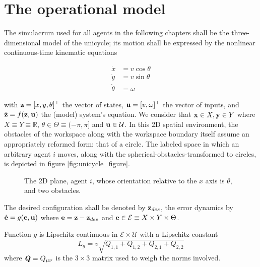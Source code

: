 \section{The operational model}

The simulacrum used for all agents in the following chapters shall be the
three-dimensional model of the unicycle; its motion shall be expressed by the
nonlinear continuous-time kinematic equations

\begin{align}
\label{eq:unicycle_kinematic}
  \dot{x}       &= v \cos\theta \\
  \dot{y}       &= v \sin\theta \\
  \dot{\theta}  &= \omega
\end{align}

with $\bm{\mathbf{z}} = [x,y,\theta]^{\top}$ the vector of states,
$\bm{\mathbf{u}} = [v, \omega]^{\top}$ the vector of inputs, and $\dot{\bm{\mathbf{z}}} =
f(\bm{\mathbf{z}}, \bm{\mathbf{u}})$ the (model) system's equation. We consider that
$\bm{\mathbf{x}} \in X, \bm{\mathbf{y}} \in Y$ where $X \equiv Y \equiv \mathbb{R}$,
$\theta \in \Theta \equiv (-\pi, \pi]$ and $\bm{\mathbf{u}} \in \mathcal{U}$.
In this 2D spatial environment, the obstacles of the workspace along with the
workspace boundary itself assume an appropriately reformed form: that of a
circle. The labeled space in which an arbitrary agent $i$ moves, along with the
spherical-obstacles-transformed to circles, is depicted in figure
\eqref{fig:unicycle_figure}.

\begin{figure}[H]\centering
  
  \caption{The 2D plane, agent $i$, whose orientation relative to the $x$
    axis is $\theta$, and two obstacles.}
  \label{fig:unicycle_figure}
\end{figure}

The desired configuration shall be denoted by $\bm{\mathbf{z}}_{des}$,
the error dynamics by $\dot{\bm{\mathbf{e}}} = g(\bm{\mathbf{e}}, \bm{\mathbf{u}})$
where $\bm{\mathbf{e}} = \bm{\mathbf{z}} - \bm{\mathbf{z}}_{des}$ and
$\bm{\mathbf{e}} \in \mathcal{E} \equiv X \times Y \times \Theta$.

\begin{lemma}
  \label{lemma:lipschitz_unicycle}
  Function $g$ is Lipschitz continuous in $\mathcal{E} \times \mathcal{U}$ with
  a Lipschitz constant $$L_g = v \sqrt{Q_{1,1}+Q_{1,2}+Q_{2,1}+Q_{2,2}}$$
  where $\bm{\mathit{Q}} = Q_{\mu\nu}$ is the $3 \times 3$ matrix used to weigh the
  norms involved.
\end{lemma}
